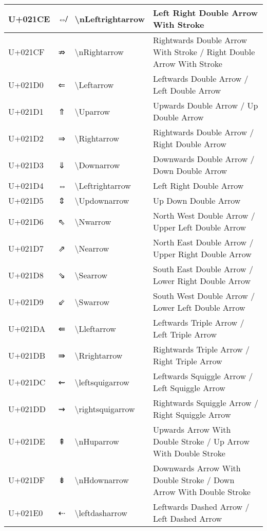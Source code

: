 \begin{table}[h]
\begin{tabulary}{\linewidth}{|L|L|L|L|}
\hline
U+021CE & ⇎ & {\textbackslash}nLeftrightarrow & Left Right Double Arrow With Stroke \\
\hline
U+021CF & ⇏ & {\textbackslash}nRightarrow & Rightwards Double Arrow With Stroke / Right Double Arrow With Stroke \\
\hline
U+021D0 & ⇐ & {\textbackslash}Leftarrow & Leftwards Double Arrow / Left Double Arrow \\
\hline
U+021D1 & ⇑ & {\textbackslash}Uparrow & Upwards Double Arrow / Up Double Arrow \\
\hline
U+021D2 & ⇒ & {\textbackslash}Rightarrow & Rightwards Double Arrow / Right Double Arrow \\
\hline
U+021D3 & ⇓ & {\textbackslash}Downarrow & Downwards Double Arrow / Down Double Arrow \\
\hline
U+021D4 & ⇔ & {\textbackslash}Leftrightarrow & Left Right Double Arrow \\
\hline
U+021D5 & ⇕ & {\textbackslash}Updownarrow & Up Down Double Arrow \\
\hline
U+021D6 & ⇖ & {\textbackslash}Nwarrow & North West Double Arrow / Upper Left Double Arrow \\
\hline
U+021D7 & ⇗ & {\textbackslash}Nearrow & North East Double Arrow / Upper Right Double Arrow \\
\hline
U+021D8 & ⇘ & {\textbackslash}Searrow & South East Double Arrow / Lower Right Double Arrow \\
\hline
U+021D9 & ⇙ & {\textbackslash}Swarrow & South West Double Arrow / Lower Left Double Arrow \\
\hline
U+021DA & ⇚ & {\textbackslash}Lleftarrow & Leftwards Triple Arrow / Left Triple Arrow \\
\hline
U+021DB & ⇛ & {\textbackslash}Rrightarrow & Rightwards Triple Arrow / Right Triple Arrow \\
\hline
U+021DC & ⇜ & {\textbackslash}leftsquigarrow & Leftwards Squiggle Arrow / Left Squiggle Arrow \\
\hline
U+021DD & ⇝ & {\textbackslash}rightsquigarrow & Rightwards Squiggle Arrow / Right Squiggle Arrow \\
\hline
U+021DE & ⇞ & {\textbackslash}nHuparrow & Upwards Arrow With Double Stroke / Up Arrow With Double Stroke \\
\hline
U+021DF & ⇟ & {\textbackslash}nHdownarrow & Downwards Arrow With Double Stroke / Down Arrow With Double Stroke \\
\hline
U+021E0 & ⇠ & {\textbackslash}leftdasharrow & Leftwards Dashed Arrow / Left Dashed Arrow \\

\end{tabulary}
\end{table}
